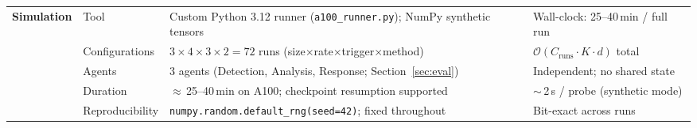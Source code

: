 \begin{table}[t]
\begin{tabularx}{\textwidth}{@{} p{1.9cm} p{2.4cm} X p{4.5cm} @{}}
\multirow{5}{*}{\textbf{Simulation}}
  & Tool            & Custom Python 3.12 runner (\texttt{a100\_runner.py}); NumPy synthetic tensors
            & Wall-clock: 25--40\,min / full run \\
  & Configurations  & $3\!\times\!4\!\times\!3\!\times\!2 = 72$ runs (size$\times$rate$\times$trigger$\times$method)
            & $\mathcal{O}(C_{\text{runs}} \cdot K \cdot d)$ total \\
  & Agents          & 3 agents (Detection, Analysis, Response; Section~\ref{sec:eval})
            & Independent; no shared state \\
  & Duration        & $\approx$\,25--40\,min on A100; checkpoint resumption supported
            & $\sim$\,2\,s / probe (synthetic mode) \\
  & Reproducibility & \texttt{numpy.random.default\_rng(seed=42)}; fixed throughout
            & Bit-exact across runs \\

\bottomrule
\end{tabularx}
\end{table}
